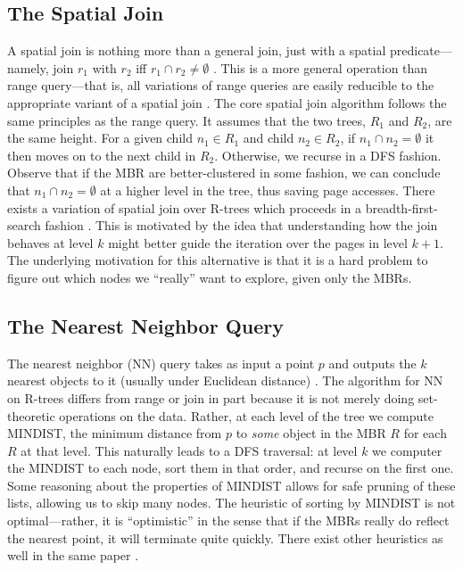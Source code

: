 \subsection{The Spatial Join}
A spatial join is nothing more than a general join, just with a spatial predicate---namely, join $r_1$ with $r_2$ iff $r_1\cap r_2\neq\emptyset$ \cite{brinkhoffkriegelseeger93}.
This is a more general operation than range query---that is, all variations of range queries are easily reducible to the appropriate variant of a spatial join \cite{gaedegunther98}.
The core spatial join algorithm \cite{brinkhoffkriegelseeger93} follows the same principles as the range query.
It assumes that the two trees, $R_1$ and $R_2$, are the same height.
For a given child $n_1\in R_1$ and child $n_2\in R_2$, if $n_1\cap n_2=\emptyset$ it then moves on to the next child in $R_2$.
Otherwise, we recurse in a DFS fashion.
Observe that if the MBR are better-clustered in some fashion, we can conclude that $n_1\cap n_2=\emptyset$ at a higher level in the tree, thus saving page accesses.
There exists a variation of spatial join over R-trees which proceeds in a breadth-first-search fashion \cite{huangjingrundensteiner97}.
This is motivated by the idea that understanding how the join behaves at level $k$ might better guide the iteration over the pages in level $k+1$.
The underlying motivation for this alternative is that it is a hard problem to figure out which nodes we ``really'' want to explore, given only the MBRs.

\subsection{The Nearest Neighbor Query}
The nearest neighbor (NN) query takes as input a point $p$ and outputs the $k$ nearest objects to it (usually under Euclidean distance) \cite{roussopouloskelleyvincent95}.
The algorithm for NN on R-trees differs from range or join in part because it is not merely doing set-theoretic operations on the data. 
Rather, at each level of the tree we compute MINDIST, the minimum distance from $p$ to \emph{some} object in the MBR $R$ for each $R$ at that level.
This naturally leads to a DFS traversal: at level $k$ we computer the MINDIST to each node, sort them in that order, and recurse on the first one.
Some reasoning about the properties of MINDIST allows for safe pruning of these lists, allowing us to skip many nodes.
The heuristic of sorting by MINDIST is not optimal---rather, it is ``optimistic'' in the sense that if the MBRs really do reflect the nearest point, it will terminate quite quickly.
There exist other heuristics as well in the same paper \cite{roussopouloskelleyvincent95}.

